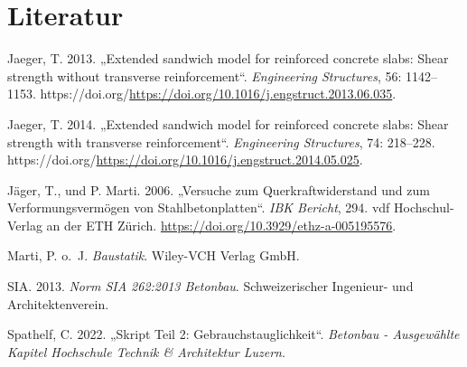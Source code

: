 \documentclass[
  letterpaper,
]{scrreprt}
\newlength{\cslhangindent}
\newlength{\cslentryspacingunit} %
\newenvironment{CSLReferences}[2] %
 {%
  \setlength{\parindent}{0pt}
  \ifodd #1
  \let\oldpar\par
  \def\par{\hangindent=\cslhangindent\oldpar}
  \fi
  \setlength{\parskip}{#2\cslentryspacingunit}
 }%
 {}
\begin{document}

\hypertarget{literatur}{%
\chapter*{Literatur}\label{literatur}}


\hypertarget{refs}{}
\begin{CSLReferences}{1}{0}
\leavevmode{}%
Jaeger, T. 2013. {„Extended sandwich model for reinforced concrete
slabs: Shear strength without transverse reinforcement``}.
\emph{Engineering Structures}, 56: 1142--1153.
https://doi.org/\url{https://doi.org/10.1016/j.engstruct.2013.06.035}.

\leavevmode{}%
Jaeger, T. 2014. {„Extended sandwich model for reinforced concrete
slabs: Shear strength with transverse reinforcement``}.
\emph{Engineering Structures}, 74: 218--228.
https://doi.org/\url{https://doi.org/10.1016/j.engstruct.2014.05.025}.

\leavevmode{}%
Jäger, T., und P. Marti. 2006. {„Versuche zum {Querkraftwiderstand} und
zum {Verformungsvermögen} von {Stahlbetonplatten}``}. \emph{IBK
Bericht}, 294. vdf Hochschul-Verlag an der ETH Zürich.
\url{https://doi.org/10.3929/ethz-a-005195576}.

\leavevmode{}%
Marti, P. o.~J. \emph{Baustatik}. Wiley-VCH Verlag GmbH.

\leavevmode{}%
SIA. 2013. \emph{Norm {SIA} 262:2013 {Betonbau}}. {Schweizerischer
Ingenieur- und Architektenverein}.

\leavevmode{}%
Spathelf, C. 2022. {„Skript Teil 2: Gebrauchstauglichkeit``}.
\emph{Betonbau - Ausgewählte Kapitel Hochschule Technik \& Architektur
Luzern}.

\end{CSLReferences}
\end{document}
